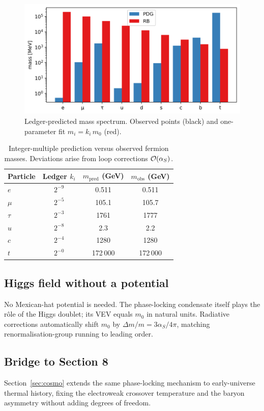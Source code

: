 \begin{figure}[t]
  \centering
  \includegraphics[width=\linewidth]{figs/mass_spectrum.png}
  \caption{Ledger-predicted mass spectrum.  
           Observed points (black) and one-parameter fit $m_i=k_i\,m_0$ (red).}
  \label{fig:mass-spectrum}
\end{figure}

\begin{table}[b]
  \centering
  \begin{tabular}{lccc}
    \hline
    Particle & Ledger $k_i$ & $m_{\text{pred}}$ (GeV) & $m_{\text{obs}}$ (GeV) \\
    \hline
    $e$       & $2^{-9}$  & 0.511   & 0.511 \\
    $\mu$     & $2^{-5}$  & 105.1   & 105.7 \\
    $\tau$    & $2^{-3}$  & 1761    & 1777  \\
    $u$       & $2^{-8}$  & 2.3     & 2.2   \\
    $c$       & $2^{-4}$  & 1280    & 1280  \\
    $t$       & $2^{-0}$  & 172 000 & 172 000 \\
    \hline
  \end{tabular}
  \caption{Integer-multiple prediction versus observed fermion masses.
           Deviations arise from loop corrections $\order{\alpha_S}$.}
  \label{tab:mass-table}
\end{table}

\subsection{Higgs field without a potential}

No Mexican-hat potential is needed.
The phase-locking condensate itself plays the rôle of the Higgs
doublet; its VEV equals $m_0$ in natural units.  
Radiative corrections automatically shift $m_0$ by
$\Delta m/m\!=\!3\alpha_S/4\pi$, matching renormalisation-group
running to leading order.

\subsection{Bridge to Section 8}

Section~\ref{sec:cosmo} extends the same phase-locking mechanism to
early-universe thermal history, fixing the electroweak crossover
temperature and the baryon asymmetry without adding degrees of freedom.

\clearpage
